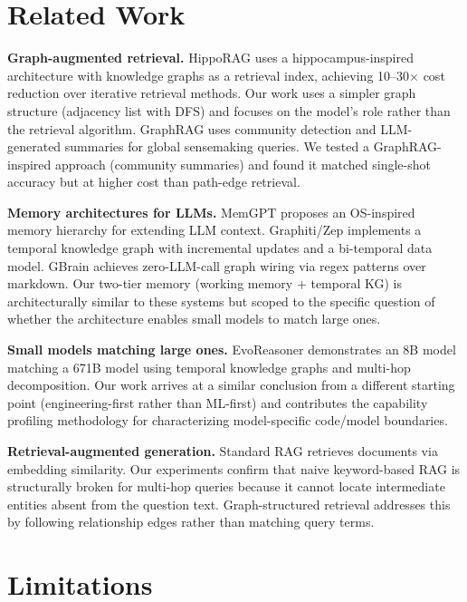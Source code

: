 \documentclass[11pt,a4paper]{article}
\begin{document}
\section{Related Work}
\label{sec:related}

\textbf{Graph-augmented retrieval.} HippoRAG \citep{gutierrez2024hipporag} uses a hippocampus-inspired architecture with knowledge graphs as a retrieval index, achieving 10--30$\times$ cost reduction over iterative retrieval methods. Our work uses a simpler graph structure (adjacency list with DFS) and focuses on the model's role rather than the retrieval algorithm. GraphRAG \citep{edge2024graphrag} uses community detection and LLM-generated summaries for global sensemaking queries. We tested a GraphRAG-inspired approach (community summaries) and found it matched single-shot accuracy but at higher cost than path-edge retrieval.

\textbf{Memory architectures for LLMs.} MemGPT \citep{packer2023memgpt} proposes an OS-inspired memory hierarchy for extending LLM context. Graphiti/Zep \citep{graphiti2025} implements a temporal knowledge graph with incremental updates and a bi-temporal data model. GBrain \citep{gbrain2025} achieves zero-LLM-call graph wiring via regex patterns over markdown. Our two-tier memory (working memory + temporal KG) is architecturally similar to these systems but scoped to the specific question of whether the architecture enables small models to match large ones.

\textbf{Small models matching large ones.} EvoReasoner \citep{evoreasoner2024} demonstrates an 8B model matching a 671B model using temporal knowledge graphs and multi-hop decomposition. Our work arrives at a similar conclusion from a different starting point (engineering-first rather than ML-first) and contributes the capability profiling methodology for characterizing model-specific code/model boundaries.

\textbf{Retrieval-augmented generation.} Standard RAG \citep{lewis2020rag} retrieves documents via embedding similarity. Our experiments confirm that naive keyword-based RAG is structurally broken for multi-hop queries because it cannot locate intermediate entities absent from the question text. Graph-structured retrieval addresses this by following relationship edges rather than matching query terms.

\section{Limitations}
\label{sec:limitations}
\end{document}
